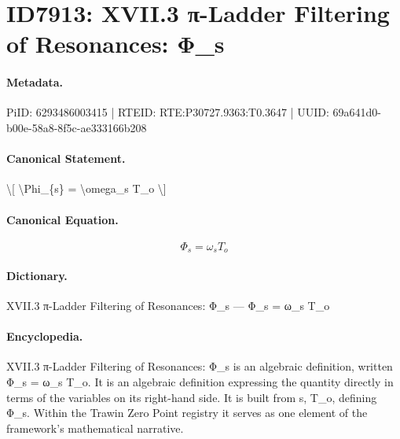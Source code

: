 \section*{ID7913: XVII.3 π-Ladder Filtering of Resonances: Φ\_s}
\paragraph{Metadata.}
PiID: 6293486003415 | RTEID: RTE:P30727.9363:T0.3647 | UUID: 69a641d0-b00e-58a8-8f5c-ae333166b208

\paragraph{Canonical Statement.}
\textbackslash{}[ \textbackslash{}Phi\_\{s\} = \textbackslash{}omega\_s T\_o \textbackslash{}]

\paragraph{Canonical Equation.}
\[
\Phi_{s} = \omega_s T_o
\]

\paragraph{Dictionary.}
XVII.3 π-Ladder Filtering of Resonances: Φ\_s — Φ\_s = ω\_s T\_o

\paragraph{Encyclopedia.}
XVII.3 π-Ladder Filtering of Resonances: Φ\_s is an algebraic definition, written Φ\_s = ω\_s T\_o. It is an algebraic definition expressing the quantity directly in terms of the variables on its right-hand side. It is built from s, T\_o, defining Φ\_s. Within the Trawin Zero Point registry it serves as one element of the framework's mathematical narrative.
